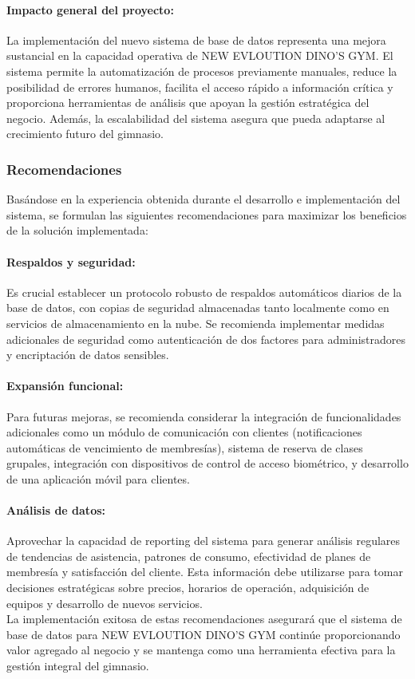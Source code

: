 \documentclass[12pt, letterpaper]{article}
\begin{document}
\paragraph{Impacto general del proyecto:}
La implementación del nuevo sistema de base de datos representa una mejora sustancial en la capacidad operativa de NEW EVLOUTION DINO'S GYM. El sistema permite la automatización de procesos previamente manuales, reduce la posibilidad de errores humanos, facilita el acceso rápido a información crítica y proporciona herramientas de análisis que apoyan la gestión estratégica del negocio. Además, la escalabilidad del sistema asegura que pueda adaptarse al crecimiento futuro del gimnasio.

\subsubsection{Recomendaciones}
Basándose en la experiencia obtenida durante el desarrollo e implementación del sistema, se formulan las siguientes recomendaciones para maximizar los beneficios de la solución implementada:\\
\paragraph{Respaldos y seguridad:}
Es crucial establecer un protocolo robusto de respaldos automáticos diarios de la base de datos, con copias de seguridad almacenadas tanto localmente como en servicios de almacenamiento en la nube. Se recomienda implementar medidas adicionales de seguridad como autenticación de dos factores para administradores y encriptación de datos sensibles.\\
\paragraph{Expansión funcional:}
Para futuras mejoras, se recomienda considerar la integración de funcionalidades adicionales como un módulo de comunicación con clientes (notificaciones automáticas de vencimiento de membresías), sistema de reserva de clases grupales, integración con dispositivos de control de acceso biométrico, y desarrollo de una aplicación móvil para clientes.\\
\paragraph{Análisis de datos:}
Aprovechar la capacidad de reporting del sistema para generar análisis regulares de tendencias de asistencia, patrones de consumo, efectividad de planes de membresía y satisfacción del cliente. Esta información debe utilizarse para tomar decisiones estratégicas sobre precios, horarios de operación, adquisición de equipos y desarrollo de nuevos servicios.\\
La implementación exitosa de estas recomendaciones asegurará que el sistema de base de datos para NEW EVLOUTION DINO'S GYM continúe proporcionando valor agregado al negocio y se mantenga como una herramienta efectiva para la gestión integral del gimnasio.
\newpage
\end{document}
